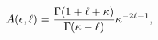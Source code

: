 \[A(\epsilon,\ell)=\frac{\mathop{\Gamma\/}\nolimits\!\left(1+\ell+\kappa\right)}%
{\mathop{\Gamma\/}\nolimits\!\left(\kappa-\ell\right)}\kappa^{-2\ell-1},\]